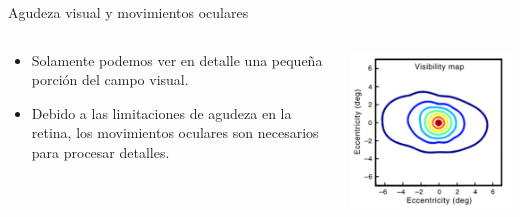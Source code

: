 \documentclass[compress]{beamer}
\begin{document}
\begin{frame}{Agudeza visual y movimientos oculares}

  \begin{columns}[T]
    \begin{column}{.6\textwidth}
        \vspace{0.8cm}
        \begin{itemize}
        \item Solamente podemos ver en detalle una pequeña porción del campo visual.
        \item Debido a las limitaciones de agudeza en la retina, los movimientos oculares son necesarios para procesar detalles.
        \end{itemize}
    \end{column}
    \begin{column}{.4\textwidth}
        \begin{center}
        \includegraphics[width=\textwidth]{images/visibility-map-sin-ref.png} 
        \end{center}
    \end{column}
  \end{columns}
\end{frame}
\end{document}
